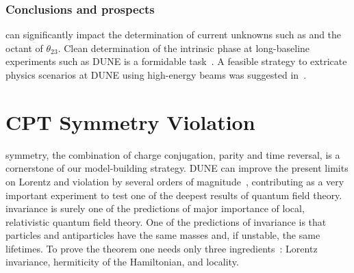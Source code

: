 \subsubsection{Conclusions and prospects}
 can significantly impact the determination of current unknowns such as  and the octant of $\theta_{23}$. Clean determination of the intrinsic  phase at long-baseline experiments such as DUNE is a formidable task~\cite{Rout:2017udo}. A feasible strategy to extricate physics scenarios at DUNE using high-energy beams was suggested in~\cite{Masud:2017bcf}.


\section{CPT Symmetry Violation}

 symmetry, the combination of charge conjugation, parity and time reversal, is a cornerstone of our model-building strategy. 
DUNE can improve the present limits on Lorentz and  violation by several orders of magnitude~\cite{Streater:1989vi,Barenboim:2002tz,Kostelecky:2003cr,Diaz:2009qk,Kostelecky:2011gq,Barenboim:2017ewj}, contributing as a very important experiment to test one of the deepest results of quantum field theory.
%
 invariance is surely one of the predictions of major importance of local, relativistic quantum field theory. One of the predictions of  invariance is that particles and antiparticles have the same masses and, if unstable, the same lifetimes. To prove the  theorem one needs only three ingredients~\cite{Streater:1989vi}: Lorentz invariance, hermiticity of the Hamiltonian, and locality.
%


